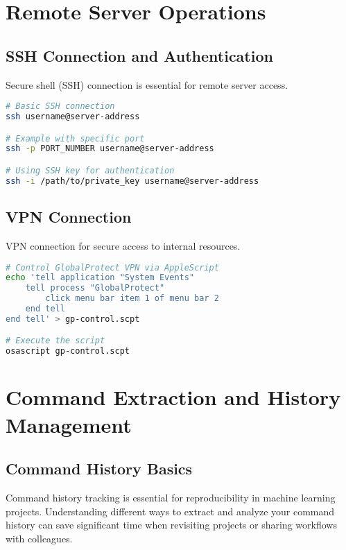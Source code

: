 \documentclass{article}
\begin{document}
\section{Remote Server Operations}

\subsection{SSH Connection and Authentication}
Secure shell (SSH) connection is essential for remote server access.

\begin{tcolorbox}[colback=blue!5!white, colframe=blue!75!black, title=SSH Connection Commands]
\begin{lstlisting}[language=bash]
# Basic SSH connection
ssh username@server-address

# Example with specific port
ssh -p PORT_NUMBER username@server-address

# Using SSH key for authentication
ssh -i /path/to/private_key username@server-address
\end{lstlisting}
\end{tcolorbox}

\subsection{VPN Connection}
VPN connection for secure access to internal resources.

\begin{tcolorbox}[colback=blue!5!white, colframe=blue!75!black, title=VPN Connection (MacOS)]
\begin{lstlisting}[language=bash]
# Control GlobalProtect VPN via AppleScript
echo 'tell application "System Events"
    tell process "GlobalProtect"
        click menu bar item 1 of menu bar 2
    end tell
end tell' > gp-control.scpt

# Execute the script
osascript gp-control.scpt
\end{lstlisting}
\end{tcolorbox}

\section{Command Extraction and History Management}
\subsection{Command History Basics}

Command history tracking is essential for reproducibility in machine learning projects. Understanding different ways to extract and analyze your command history can save significant time when revisiting projects or sharing workflows with colleagues.
\end{document}
